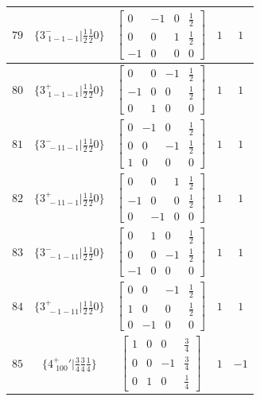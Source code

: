 \documentclass[fleqn,8pt]{jsarticle}
\begin{document}
\begin{longtable}{ccccc}
$ 79 $ & $ \{3^{-}_{\,\,1-1-1}|\frac{1}{2} \frac{1}{2} 0\} $ & $ \begin{bmatrix} 0 & -1 & 0 & \frac{1}{2} \\ 0 & 0 & 1 & \frac{1}{2} \\ -1 & 0 & 0 & 0 \end{bmatrix} $ & $ 1 $ & $ 1 $ \\ \hline
$ 80 $ & $ \{3^{+}_{\,\,1-1-1}|\frac{1}{2} \frac{1}{2} 0\} $ & $ \begin{bmatrix} 0 & 0 & -1 & \frac{1}{2} \\ -1 & 0 & 0 & \frac{1}{2} \\ 0 & 1 & 0 & 0 \end{bmatrix} $ & $ 1 $ & $ 1 $ \\ \hline
$ 81 $ & $ \{3^{-}_{\,\,-11-1}|\frac{1}{2} \frac{1}{2} 0\} $ & $ \begin{bmatrix} 0 & -1 & 0 & \frac{1}{2} \\ 0 & 0 & -1 & \frac{1}{2} \\ 1 & 0 & 0 & 0 \end{bmatrix} $ & $ 1 $ & $ 1 $ \\ \hline
$ 82 $ & $ \{3^{+}_{\,\,-11-1}|\frac{1}{2} \frac{1}{2} 0\} $ & $ \begin{bmatrix} 0 & 0 & 1 & \frac{1}{2} \\ -1 & 0 & 0 & \frac{1}{2} \\ 0 & -1 & 0 & 0 \end{bmatrix} $ & $ 1 $ & $ 1 $ \\ \hline
$ 83 $ & $ \{3^{-}_{\,\,-1-11}|\frac{1}{2} \frac{1}{2} 0\} $ & $ \begin{bmatrix} 0 & 1 & 0 & \frac{1}{2} \\ 0 & 0 & -1 & \frac{1}{2} \\ -1 & 0 & 0 & 0 \end{bmatrix} $ & $ 1 $ & $ 1 $ \\ \hline
$ 84 $ & $ \{3^{+}_{\,\,-1-11}|\frac{1}{2} \frac{1}{2} 0\} $ & $ \begin{bmatrix} 0 & 0 & -1 & \frac{1}{2} \\ 1 & 0 & 0 & \frac{1}{2} \\ 0 & -1 & 0 & 0 \end{bmatrix} $ & $ 1 $ & $ 1 $ \\ \hline
$ 85 $ & $ \{4^{+}_{\,\,100}{}'|\frac{3}{4} \frac{3}{4} \frac{1}{4}\} $ & $ \begin{bmatrix} 1 & 0 & 0 & \frac{3}{4} \\ 0 & 0 & -1 & \frac{3}{4} \\ 0 & 1 & 0 & \frac{1}{4} \end{bmatrix} $ & $ 1 $ & $ -1 $ \\ \hline

\end{longtable}
\end{document}
